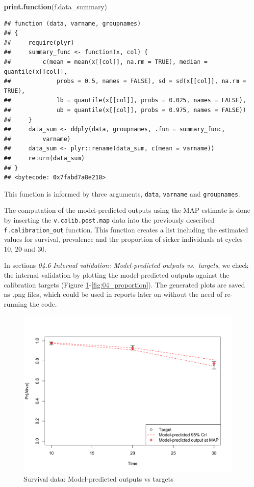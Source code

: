\documentclass[]{article}
\newenvironment{Shaded}{\begin{snugshade}}{\end{snugshade}}
\newcommand{\KeywordTok}[1]{\textcolor[rgb]{0.13,0.29,0.53}{\textbf{#1}}}
\newcommand{\NormalTok}[1]{#1}
\begin{document}
\begin{Shaded}
\begin{Highlighting}[]
\KeywordTok{print.function}\NormalTok{(f.data_summary)}
\end{Highlighting}
\end{Shaded}

\begin{verbatim}
## function (data, varname, groupnames) 
## {
##     require(plyr)
##     summary_func <- function(x, col) {
##         c(mean = mean(x[[col]], na.rm = TRUE), median = quantile(x[[col]], 
##             probs = 0.5, names = FALSE), sd = sd(x[[col]], na.rm = TRUE), 
##             lb = quantile(x[[col]], probs = 0.025, names = FALSE), 
##             ub = quantile(x[[col]], probs = 0.975, names = FALSE))
##     }
##     data_sum <- ddply(data, groupnames, .fun = summary_func, 
##         varname)
##     data_sum <- plyr::rename(data_sum, c(mean = varname))
##     return(data_sum)
## }
## <bytecode: 0x7fabd7a8e218>
\end{verbatim}

This function is informed by three arguments, \texttt{data},
\texttt{varname} and \texttt{groupnames}.

The computation of the model-predicted outputs using the MAP estimate is
done by inserting the \texttt{v.calib.post.map} data into the previously
described \texttt{f.calibration\_out} function. This function creates a
list including the estimated values for survival, prevalence and the
proportion of sicker individuals at cycles 10, 20 and 30.

In sections \emph{04.6 Internal validation: Model-predicted outputs
vs.~targets}, we check the internal validation by plotting the
model-predicted outputs against the calibration targets (Figure
\ref{fig:04_surv}-\ref{fig:04_proportion}). The generated plots are
saved as .png files, which could be used in reports later on without the
need of re-running the code.

\begin{figure}
\centering
\includegraphics{../figs/04_posterior-vs-targets-survival.png}
\caption{Survival data: Model-predicted outputs vs targets
\label{fig:04_surv}}
\end{figure}
\end{document}
